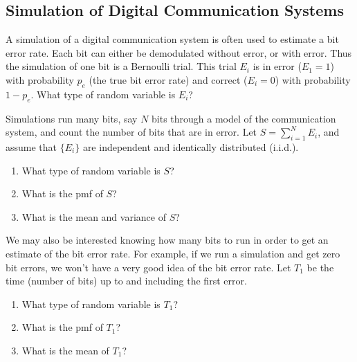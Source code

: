 
\subsection{Simulation of Digital Communication Systems}

A simulation of a digital communication system is often used to
estimate a bit error rate.  Each bit can either be demodulated
without error, or with error.  Thus the simulation of one bit is a
Bernoulli trial.  This trial $E_i$ is in error ($E_1=1$) with
probability $p_e$ (the true bit error rate) and correct ($E_i=0$)
with probability $1-p_e$.  What type of random variable is $E_i$?

Simulations run many bits, say $N$ bits through a model of the
communication system, and count the number of bits that are in
error.  Let $S = \sum_{i=1}^N E_i$, and assume that $\{E_i\}$ are
independent and identically distributed (i.i.d.).
\begin{enumerate}
  \item What type of random variable is $S$?
  \item What is the pmf of $S$?
  \item What is the mean and variance of $S$?
\end{enumerate}


We may also be interested knowing how many bits to run in order to
get an estimate of the bit error rate.  For example, if we run a
simulation and get zero bit errors, we won't have a very good idea
of the bit error rate.  Let $T_1$ be the time (number of bits) up to and including the first error.
\begin{enumerate}
  \item What type of random variable is $T_1$?
  \item What is the pmf of $T_1$?
  \item What is the mean of $T_1$?
\end{enumerate}

